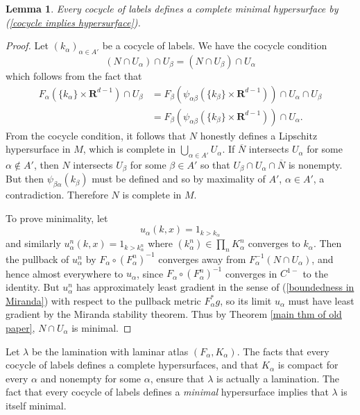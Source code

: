 \documentclass[reqno,11pt]{amsart}
\newcommand{\RR}{\mathbf{R}}
\newtheorem{lemma}[theorem]{Lemma}
\theoremstyle{definition}
\numberwithin{equation}{section}
\begin{document}
\begin{lemma}
	Every cocycle of labels defines a complete minimal hypersurface by (\ref{cocycle implies hypersurface}).
\end{lemma}
\begin{proof}
Let $(k_\alpha)_{\alpha \in A'}$ be a cocycle of labels.
We have the cocycle condition
$$(N \cap U_\alpha) \cap U_\beta = (N \cap U_\beta) \cap U_\alpha$$
which follows from the fact that
\begin{align*}
F_\alpha(\{k_\alpha\} \times \RR^{d - 1}) \cap U_\beta
&= F_\beta(\psi_{\alpha \beta}(\{k_\beta\} \times \RR^{d - 1})) \cap U_\alpha \cap U_\beta \\
&= F_\beta(\psi_{\alpha \beta}(\{k_\beta\} \times \RR^{d - 1})) \cap U_\alpha.
\end{align*}
From the cocycle condition, it follows that $N$ honestly defines a Lipschitz hypersurface in $M$, which is complete in $\bigcup_{\alpha \in A'} U_\alpha$.
If $\overline N$ intersects $U_\alpha$ for some $\alpha \notin A'$, then $N$ intersects $U_\beta$ for some $\beta \in A'$ so that $U_\beta \cap U_\alpha \cap \overline N$ is nonempty.
But then $\psi_{\beta \alpha}(k_\beta)$ must be defined and so by maximality of $A'$, $\alpha \in A'$, a contradiction.
Therefore $N$ is complete in $M$.

To prove minimality, let
$$u_\alpha(k, x) = 1_{k > k_\alpha}$$
and similarly $u_\alpha^n(k, x) = 1_{k > k_\alpha^n}$ where $(k_\alpha^n) \in \prod_n K_\alpha^n$ converges to $k_\alpha$.
Then the pullback of $u_\alpha^n$ by $F_\alpha \circ (F_\alpha^n)^{-1}$ converges away from $F_\alpha^{-1}(N \cap U_\alpha)$, and hence almost everywhere to $u_\alpha$, since $F_\alpha \circ (F_\alpha^n)^{-1}$ converges in $C^{1-}$ to the identity.
But $u_\alpha^n$ has approximately least gradient in the sense of (\ref{boundedness in Miranda}) with respect to the pullback metric $F_\alpha^* g$, so its limit $u_\alpha$ must have least gradient by the Miranda stability theorem.
Thus by Theorem \ref{main thm of old paper}, $N \cap U_\alpha$ is minimal.
\end{proof}

Let $\lambda$ be the lamination with laminar atlas $(F_\alpha, K_\alpha)$.
The facts that every cocycle of labels defines a complete hypersurfaces, and that $K_\alpha$ is compact for every $\alpha$ and nonempty for some $\alpha$, ensure that $\lambda$ is actually a lamination.
The fact that every cocycle of labels defines a \emph{minimal} hypersurface implies that $\lambda$ is itself minimal.
\end{document}
